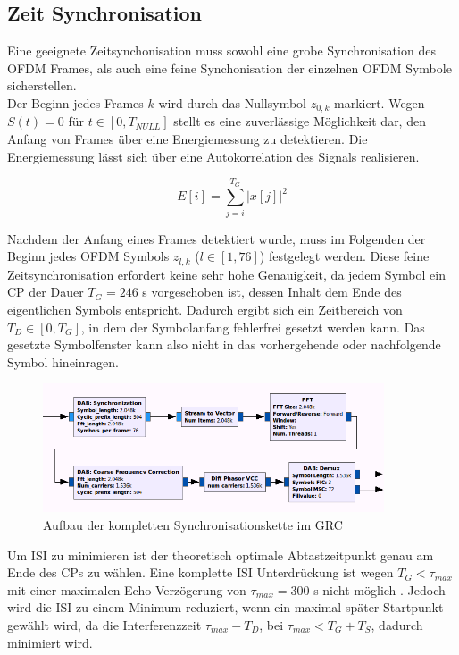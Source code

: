 \subsection{Zeit Synchronisation}
\label{sec:time_sync}
Eine geeignete Zeitsynchonisation muss sowohl eine grobe Synchronisation des OFDM Frames, als auch eine feine Synchonisation der einzelnen OFDM Symbole sicherstellen. \\
Der Beginn jedes Frames $ k $ wird durch das Nullsymbol $z_{0,k}$ markiert. Wegen $S(t) = 0$ für $t \in [0, T_{NULL}]$ stellt es eine zuverlässige Möglichkeit dar, den Anfang von Frames über eine Energiemessung zu detektieren. Die Energiemessung lässt sich über eine Autokorrelation des Signals realisieren.

\begin{equation}
E[i] = \sum \limits_{j=i}^{T_G}|x[j]|^2
\label{eq:energy}
\end{equation}

Nachdem der Anfang eines Frames detektiert wurde, muss im Folgenden der Beginn jedes OFDM Symbols $z_{l,k}$ ($l \in [1, 76]$) festgelegt werden. Diese feine Zeitsynchronisation erfordert keine sehr hohe Genauigkeit, da jedem Symbol ein \ac{CP} der Dauer $T_G = 246$ \textmu s vorgeschoben ist, dessen Inhalt dem Ende des eigentlichen Symbols entspricht. Dadurch ergibt sich ein Zeitbereich von  $T_D \in [0,T_G]$, in dem der Symbolanfang fehlerfrei gesetzt werden kann. Das gesetzte Symbolfenster kann also nicht in das vorhergehende oder nachfolgende Symbol hineinragen.

\begin{figure}[htb]
\centering
  \includegraphics[width=0.9\textwidth]{figures/sync_hier_block.png}
	\caption{Aufbau der kompletten Synchronisationskette im \ac{GRC}}
	\label{fig:sync_overview}
\end{figure}

Um \ac{ISI} zu minimieren ist der theoretisch optimale Abtastzeitpunkt genau am Ende des CPs zu wählen. Eine komplette \ac{ISI} Unterdrückung ist wegen $T_G < \tau_{max}$ mit einer maximalen Echo Verzögerung von $\tau_{max} = 300$ \textmu s nicht möglich \cite{dab_buch}. Jedoch wird die \ac{ISI} zu einem Minimum reduziert, wenn ein maximal später Startpunkt gewählt wird, da die Interferenzzeit $\tau_{max} - T_D$, bei $\tau_{max} < T_G+T_S$, dadurch minimiert wird.\\

